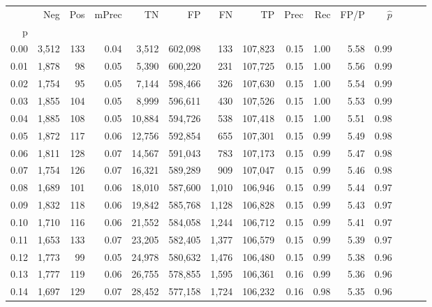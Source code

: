 \begin{tabular}{rrrrrrrrrrrrrrr}
\toprule
{} &     Neg &    Pos & mPrec &       TN &       FP &       FN &       TP &  Prec &   Rec &  FP/P & $\hat{p}$ \\
p    &         &        &       &          &          &          &          &       &       &       &           \\
\midrule
0.00 &   3,512 &    133 &  0.04 &    3,512 &  602,098 &      133 &  107,823 &  0.15 &  1.00 &  5.58 &      0.99 \\
0.01 &   1,878 &     98 &  0.05 &    5,390 &  600,220 &      231 &  107,725 &  0.15 &  1.00 &  5.56 &      0.99 \\
0.02 &   1,754 &     95 &  0.05 &    7,144 &  598,466 &      326 &  107,630 &  0.15 &  1.00 &  5.54 &      0.99 \\
0.03 &   1,855 &    104 &  0.05 &    8,999 &  596,611 &      430 &  107,526 &  0.15 &  1.00 &  5.53 &      0.99 \\
0.04 &   1,885 &    108 &  0.05 &   10,884 &  594,726 &      538 &  107,418 &  0.15 &  1.00 &  5.51 &      0.98 \\
0.05 &   1,872 &    117 &  0.06 &   12,756 &  592,854 &      655 &  107,301 &  0.15 &  0.99 &  5.49 &      0.98 \\
0.06 &   1,811 &    128 &  0.07 &   14,567 &  591,043 &      783 &  107,173 &  0.15 &  0.99 &  5.47 &      0.98 \\
0.07 &   1,754 &    126 &  0.07 &   16,321 &  589,289 &      909 &  107,047 &  0.15 &  0.99 &  5.46 &      0.98 \\
0.08 &   1,689 &    101 &  0.06 &   18,010 &  587,600 &    1,010 &  106,946 &  0.15 &  0.99 &  5.44 &      0.97 \\
0.09 &   1,832 &    118 &  0.06 &   19,842 &  585,768 &    1,128 &  106,828 &  0.15 &  0.99 &  5.43 &      0.97 \\
0.10 &   1,710 &    116 &  0.06 &   21,552 &  584,058 &    1,244 &  106,712 &  0.15 &  0.99 &  5.41 &      0.97 \\
0.11 &   1,653 &    133 &  0.07 &   23,205 &  582,405 &    1,377 &  106,579 &  0.15 &  0.99 &  5.39 &      0.97 \\
0.12 &   1,773 &     99 &  0.05 &   24,978 &  580,632 &    1,476 &  106,480 &  0.15 &  0.99 &  5.38 &      0.96 \\
0.13 &   1,777 &    119 &  0.06 &   26,755 &  578,855 &    1,595 &  106,361 &  0.16 &  0.99 &  5.36 &      0.96 \\
0.14 &   1,697 &    129 &  0.07 &   28,452 &  577,158 &    1,724 &  106,232 &  0.16 &  0.98 &  5.35 &      0.96 \\

\end{tabular}
